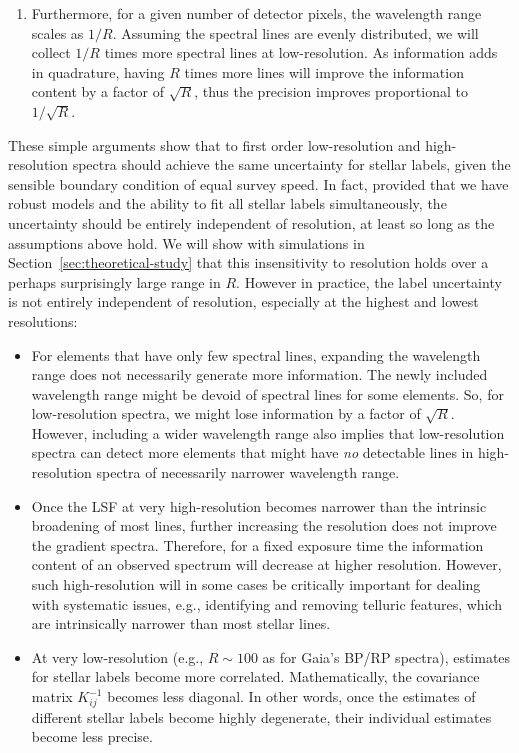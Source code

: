 \documentclass[iop]{emulateapj}
\begin{document}
\begin{CJK*}{UTF8}{gbsn}
\begin{enumerate}
\item Furthermore, for a given number of detector pixels, the wavelength range scales as $1/R$. Assuming the spectral lines are evenly distributed, we will collect $1/R$ times more spectral lines at low-resolution. As information adds in quadrature, having $R$ times more lines will improve the information content by a factor of $\sqrt{R}$, thus the precision improves proportional to $1/\sqrt{R}$.
\end{enumerate}

These simple arguments show that to first order low-resolution and high-resolution spectra should achieve the same uncertainty for stellar labels, given the sensible boundary condition of equal survey speed. In fact, provided that we have robust models and the ability to fit all stellar labels simultaneously, the uncertainty should be entirely independent of resolution, at least so long as the assumptions above hold. We will show with simulations in Section~\ref{sec:theoretical-study} that this insensitivity to resolution holds over a perhaps surprisingly large range in $R$. However in practice, the label uncertainty is not entirely independent of resolution, especially at the highest and lowest resolutions:

\begin{itemize}
\item For elements that have only few spectral lines, expanding the wavelength range does not necessarily generate more information. The newly included wavelength range might be devoid of spectral lines for some elements. So, for low-resolution spectra, we might lose information by a factor of $\sqrt{R}$. However, including a wider wavelength range also implies that low-resolution spectra can detect more elements that might have {\it no} detectable lines in high-resolution spectra of necessarily narrower wavelength range.

\item Once the LSF at very high-resolution becomes narrower than the intrinsic broadening of most lines, further increasing the resolution does not improve the gradient spectra. Therefore, for a fixed exposure time the information content of an observed spectrum will decrease at higher resolution. However, such high-resolution will in some cases be critically important for dealing with systematic issues, e.g., identifying and removing telluric features, which are intrinsically narrower than most stellar lines.

\item At very low-resolution (e.g., $R\sim 100$ as for Gaia's BP/RP spectra), estimates for stellar labels become more correlated. Mathematically, the covariance matrix $K_{ij}^{-1}$ becomes less diagonal.  In other words, once the estimates of different stellar labels become highly degenerate, their individual estimates become less precise.


\end{itemize}
\end{CJK*}
\end{document}
